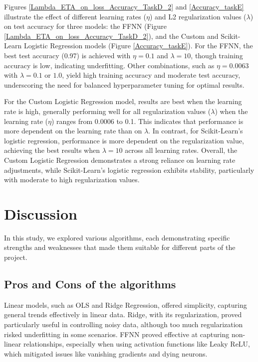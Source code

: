 \documentclass{article}
\newcommand{\0}{\mathbf{0}}
\newcommand{\1}{\mathbf{1}}
\begin{document}
Figures \ref{Lambda_ETA_on_loss_Accuracy_TaskD_2} and \ref{Accuracy_taskE} illustrate the effect of different learning rates (\(\eta\)) and L2 regularization values (\(\lambda\)) on test accuracy for three models: the FFNN (Figure \ref{Lambda_ETA_on_loss_Accuracy_TaskD_2}), and the Custom and Scikit-Learn Logistic Regression models (Figure \ref{Accuracy_taskE}). For the FFNN, the best test accuracy (0.97) is achieved with \(\eta = 0.1\) and \(\lambda = 10\), though training accuracy is low, indicating underfitting. Other combinations, such as \(\eta = 0.0063\) with \(\lambda = 0.1\) or \(1.0\), yield high training accuracy and moderate test accuracy, underscoring the need for balanced hyperparameter tuning for optimal results.

For the Custom Logistic Regression model, results are best when the learning rate is high, generally performing well for all regularization values (\(\lambda\)) when the learning rate (\(\eta\)) ranges from 0.0006 to 0.1. This indicates that performance is more dependent on the learning rate than on \(\lambda\). In contrast, for Scikit-Learn's logistic regression, performance is more dependent on the regularization value, achieving the best results when \(\lambda = 10\) across all learning rates. Overall, the Custom Logistic Regression demonstrates a strong reliance on learning rate adjustments, while Scikit-Learn's logistic regression exhibits stability, particularly with moderate to high regularization values.




\section{Discussion}

In this study, we explored various algorithms, each demonstrating specific strengths and weaknesses that made them suitable for different parts of the project.

\subsection{Pros and Cons of the algorithms}


 Linear models, such as OLS and Ridge Regression, offered simplicity, capturing general trends effectively in linear data. Ridge, with its regularization, proved particularly useful in controlling noisy data, although too much regularization risked underfitting in some scenarios. FFNN proved effective at capturing non-linear relationships, especially when using activation functions like Leaky ReLU, which mitigated issues like vanishing gradients and dying neurons.
\end{document}
